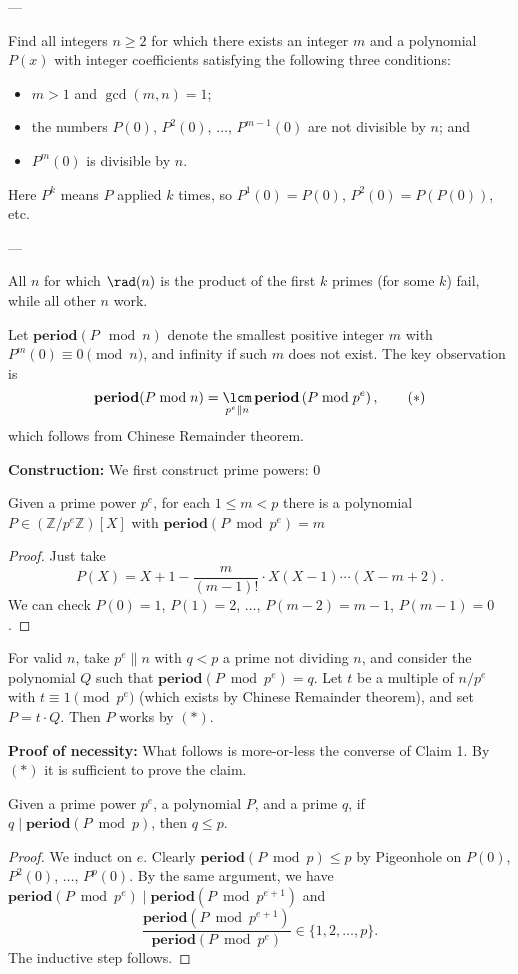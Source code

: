 
---

Find all integers $n\ge2$ for which there exists an integer $m$ and a polynomial $P(x)$ with integer coefficients satisfying the following three conditions:
\begin{itemize}
    \item $m>1$ and $\gcd(m,n)=1$;
    \item the numbers $P(0)$, $P^2(0)$, $\ldots$, $P^{m-1}(0)$ are not divisible by $n$; and
    \item $P^m(0)$ is divisible by $n$.
\end{itemize}
Here $P^k$ means $P$ applied $k$ times, so $P^1(0)=P(0)$, $P^2(0)=P(P(0))$, etc.

---

All $n$ for which $\rad(n)$ is the product of the first $k$ primes (for some $k$) fail, while all other $n$ work.

Let $\mathbf{period}(P\mod n)$ denote the smallest positive integer $m$ with $P^m(0)\equiv0\pmod n$, and infinity if such $m$ does not exist. The key observation is \[\mathbf{period}(P\bmod n)=\mathop{\lcm}_{p^e\parallel n}\mathbf{period}\left(P\bmod p^e\right),\tag{$*$}\]
which follows from Chinese Remainder theorem.

\bigskip

\textbf{Construction:} We first construct prime powers:
\setcounter{claim}0
\begin{claim}
    Given a prime power $p^e$, for each $1\le m<p$ there is a polynomial $P\in(\mathbb Z/p^e\mathbb Z)[X]$ with $\mathbf{period}(P\bmod p^e)=m$
\end{claim}
\begin{proof}
    Just take \[P(X)=X+1-\frac m{(m-1)!}\cdot X(X-1)\cdots(X-m+2).\]
    We can check $P(0)=1$, $P(1)=2$, $\ldots$, $P(m-2)=m-1$, $P(m-1)=0$.
\end{proof}

For valid $n$, take $p^e\parallel n$ with $q<p$ a prime not dividing $n$, and consider the polynomial $Q$ such that $\mathbf{period}(P\bmod p^e)=q$. Let $t$ be a multiple of $n/p^e$ with $t\equiv1\pmod{p^e}$ (which exists by Chinese Remainder theorem), and set $P=t\cdot Q$. Then $P$ works by $(*)$.

\bigskip

\textbf{Proof of necessity:} What follows is more-or-less the converse of Claim 1. By $(*)$ it is sufficient to prove the claim.
\begin{claim}
    Given a prime power $p^e$, a polynomial $P$, and a prime $q$, if $q\mid\mathbf{period}(P\bmod p)$, then $q\le p$.
\end{claim}
\begin{proof}
    We induct on $e$. Clearly $\mathbf{period}(P\bmod p)\le p$ by Pigeonhole on $P(0)$, $P^2(0)$, $\ldots$, $P^p(0)$. By the same argument, we have $\mathbf{period}(P\bmod p^e)\mid \mathbf{period}(P\bmod p^{e+1})$ and \[\frac{\mathbf{period}(P\bmod p^{e+1})}{\mathbf{period}(P\bmod p^e)}\in\{1,2,\ldots,p\}.\]
    The inductive step follows.
\end{proof}

